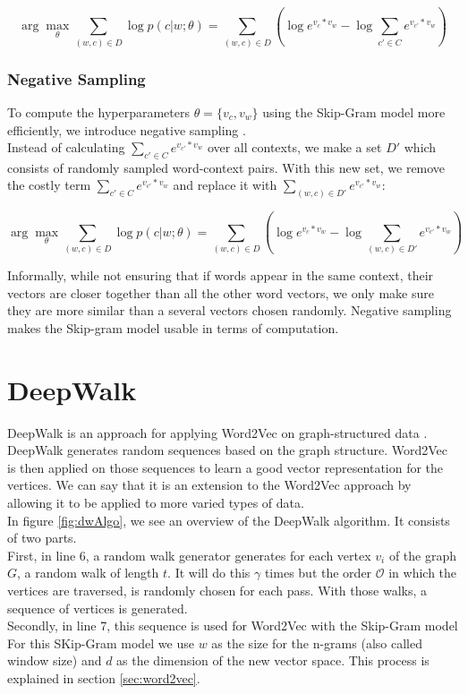 \begin{equation} 
\arg \max_{\theta} \sum_{(w,c) \in D} \log p(c|w;\theta) = \sum_{(w,c) \in D} (\log e^{v_c * v_w} - \log \sum_{c' \in C} e^{v_{c'}*v_w})
\end{equation}

\subsubsection{Negative Sampling}

To compute the hyperparameters $\theta = \{v_c, v_w\}$ using the Skip-Gram model more efficiently, we introduce negative sampling \cite{w2vExplained:article}. \\
Instead of calculating $\sum_{c' \in C}e^{v_{c'}*v_w}$ over all contexts, we make a set $D'$ which consists of randomly sampled word-context pairs. With this new set, we remove the costly term $\sum_{c' \in C}e^{v_{c'}*v_w}$ and replace it with $\sum_{(w,c) \in D'}e^{v_{c'}*v_w}$: 

\begin{equation} 
\label{eq:w2vCost}
\arg \max_{\theta} \sum_{(w,c) \in D} \log p(c|w;\theta) = \sum_{(w,c) \in D} (\log e^{v_c * v_w} - \log \sum_{(w,c) \in D'}e^{v_{c'}*v_w})
\end{equation}

Informally, while not ensuring that if words appear in the same context, their vectors are closer together than all the other word vectors, we only make sure they are more similar than a several vectors chosen randomly. Negative sampling makes the Skip-gram model usable in terms of computation.

\section{DeepWalk}
\label{sec:deepwalk}

DeepWalk is an approach for applying Word2Vec on graph-structured data \cite{deepwalkMain:article}. \\
DeepWalk generates random sequences based on the graph structure. Word2Vec is then applied on those sequences to learn a good vector representation for the vertices. We can say that it is an extension to the Word2Vec approach by allowing it to be applied to more varied types of data. \\

In figure \ref{fig:dwAlgo}, we see an overview of the DeepWalk algorithm. It consists of two parts. \\
First, in line 6, a random walk generator generates for each vertex $v_i$ of the graph $G$, a random walk of length $t$. It will do this $\gamma$ times but the order $\mathcal{O}$ in which the vertices are traversed, is randomly chosen for each pass. With those walks, a sequence of vertices is generated. \\
Secondly, in line 7, this sequence is used for Word2Vec with the Skip-Gram model For this SKip-Gram model we use $w$ as the size for the n-grams (also called window size) and $d$ as the dimension of the new vector space. This process is explained in section \ref{sec:word2vec}.

